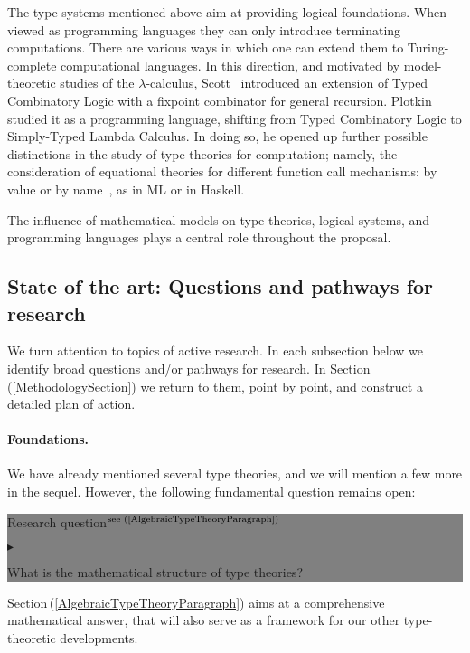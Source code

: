 \documentclass[11pt,twocolumn]{article}
\newenvironment{btritemize}
  {\begin{list}{\btr}
  {\setlength{\topsep}{2pt}
   \setlength{\partopsep}{2pt}
   \setlength{\itemsep}{2.5pt}
   \setlength{\parsep}{2.5pt}
   \setlength{\leftmargin}{1em}
   \setlength{\labelwidth}{.5em}}}
  {\end{list}}
\newcommand{\mytextsf}[1]{\textsf{\small #1}}
\newcommand{\hide}[1]{}
\newcommand{\pref}[1]{\,(\ref{#1})}
\newcommand{\lcalculus}{\mbox{$\lambda$-calculus}}
\newcommand{\btr}{$\blacktriangleright$}
\newcommand{\reqpsize}{8.113395cm}%
\newcommand{\req}[2]{\begin{center}\colorbox{grey}{\begin{minipage}{\reqpsize} 
  \mytextsf{Research question}\hfill$^{\mbox{\scriptsize see #1 }}$\\[-5.5mm]
  \begin{btritemize}
  \item #2
  \end{btritemize}
\end{minipage}}\end{center}}
\begin{document}
The type systems mentioned above aim at providing logical foundations. 
When viewed as programming languages they can only introduce terminating
computations.  There are various ways in which one can extend them to
Turing-complete computational languages.  In this direction, and motivated
by model-theoretic studies of the \lcalculus, Scott~\cite{ScottTCS}
introduced an extension of Typed Combinatory Logic with a fixpoint
combinator for general recursion.  Plotkin~\cite{PlotkinLCF} studied it as a
programming language, shifting from Typed Combinatory Logic to Simply-Typed
Lambda Calculus.  In doing so, he opened up further possible distinctions in
the study of type theories for computation; namely, the consideration of
equational theories for different function call mechanisms: by value or by
name~\cite{PlotkinCBVCBN}, as in ML or in Haskell.  

The influence of mathematical models on type theories, logical systems, and
programming languages %
plays a central role throughout the proposal.

\subsection{State of the art: Questions and pathways for research}
\label{StateOfTheArtSubsection}

We %
turn attention to topics of
active research.  In each subsection below we identify broad questions and/or
pathways for research.  In Section\pref{MethodologySection} we return to them,
point by point, and construct a detailed 
plan of action. %

\setcounter{paragraph}{0}
\paragraph{Foundations.}

We have already mentioned several type theories, and we will mention a few
more in the sequel.  However, the following fundamental question
remains open:
\req{(\ref{AlgebraicTypeTheoryParagraph})}
{What is %
  the mathematical structure of type theories?}
%
Section\pref{AlgebraicTypeTheoryParagraph} aims at a comprehensive
mathematical answer, that will also serve as a framework for our other
type-theoretic developments.  
\hide{
  We regard this as a step towards the related open question:
\req{}{What is a programming language?}
that will be kept in the background of our investigations.
}
\end{document}
